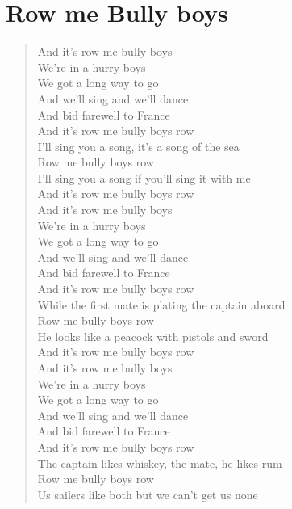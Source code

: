 \documentclass[11pt]{article}
\begin{document}
\section{Row me Bully boys}
\label{sec:org594172f}
\begin{verse}
And it's row me bully boys\\
We're in a hurry boys\\
We got a long way to go\\
And we'll sing and we'll dance\\
And bid farewell to France\\
And it's row me bully boys row\\
\vspace*{1em}
I'll sing you a song, it's a song of the sea\\
Row me bully boys row\\
I'll sing you a song if you'll sing it with me\\
And it's row me bully boys row\\
\vspace*{1em}
And it's row me bully boys\\
We're in a hurry boys\\
We got a long way to go\\
And we'll sing and we'll dance\\
And bid farewell to France\\
And it's row me bully boys row\\
\vspace*{1em}
While the first mate is plating the captain aboard\\
Row me bully boys row\\
He looks like a peacock with pistols and sword\\
And it's row me bully boys row\\
\vspace*{1em}
And it's row me bully boys\\
We're in a hurry boys\\
We got a long way to go\\
And we'll sing and we'll dance\\
And bid farewell to France\\
And it's row me bully boys row\\
\vspace*{1em}
The captain likes whiskey, the mate, he likes rum\\
Row me bully boys row\\
Us sailers like both but we can't get us none\\

\end{verse}
\end{document}
